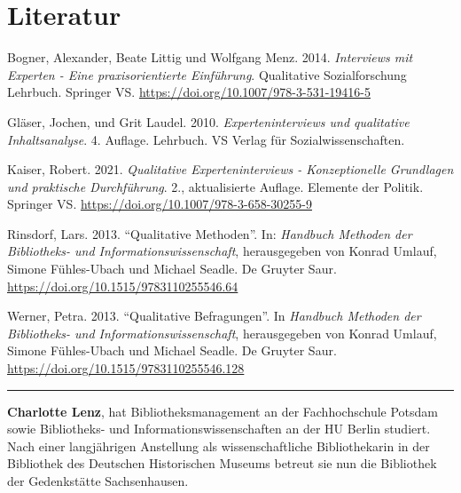 \documentclass[a4paper,
fontsize=11pt,
oneside,
numbers=noperiodatend,
parskip=half-,
bibliography=totoc,
final
]{scrartcl}
\begin{document}
\section{Literatur}\label{literatur}

Bogner, Alexander, Beate Littig und Wolfgang Menz. 2014.
\emph{Interviews mit Experten - Eine praxisorientierte Einführung}.
Qualitative Sozialforschung Lehrbuch. Springer VS.
\url{https://doi.org/10.1007/978-3-531-19416-5}

Gläser, Jochen, und Grit Laudel. 2010. \emph{Experteninterviews und
qualitative Inhaltsanalyse}. 4. Auflage. Lehrbuch. VS Verlag für
Sozialwissenschaften.

Kaiser, Robert. 2021. \emph{Qualitative Experteninterviews -
Konzeptionelle Grundlagen und praktische \linebreak Durchführung}. 2.,
aktualisierte Auflage. Elemente der Politik. Springer VS.
\url{https://doi.org/10.1007/978-3-658-30255-9}

Rinsdorf, Lars. 2013. \enquote{Qualitative Methoden}. In: \emph{Handbuch
Methoden der Bibliotheks- und Informationswissenschaft}, herausgegeben
von Konrad Umlauf, Simone Fühles-Ubach und Michael Seadle. De Gruyter
Saur. \url{https://doi.org/10.1515/9783110255546.64}

Werner, Petra. 2013. \enquote{Qualitative Befragungen}. In
\emph{Handbuch Methoden der Bibliotheks- und Informationswissenschaft},
herausgegeben von Konrad Umlauf, Simone Fühles-Ubach und Michael Seadle.
De Gruyter Saur. \url{https://doi.org/10.1515/9783110255546.128}

\begin{center}\rule{0.5\linewidth}{0.5pt}\end{center}

\textbf{Charlotte Lenz}, hat Bibliotheksmanagement an der
Fachhochschule Potsdam sowie Bibliotheks- und Informationswissenschaften
an der HU Berlin studiert. Nach einer langjährigen Anstellung als
wissenschaftliche Bibliothekarin in der Bibliothek des Deutschen
Historischen Museums betreut sie nun die Bibliothek der Gedenkstätte
Sachsenhausen.
\end{document}

